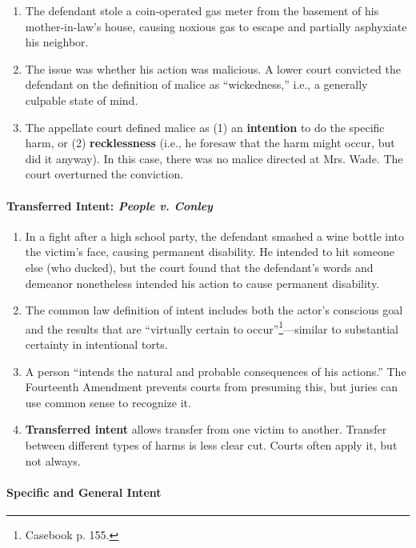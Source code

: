 \begin{enumerate}
    \item The defendant stole a coin-operated gas meter from the basement of 
    his mother-in-law's house, causing noxious gas to escape and partially 
    asphyxiate his neighbor.
    \item The issue was whether his action was malicious. A lower court 
    convicted the defendant on the definition of malice as ``wickedness,'' 
    i.e., a generally culpable state of mind.
    \item The appellate court defined malice as (1) an \textbf{intention} to 
    do the specific harm, or (2) \textbf{recklessness} (i.e., he foresaw that 
    the harm might occur, but did it anyway). In this case, there was no 
    malice directed at Mrs. Wade. The court overturned the conviction.
\end{enumerate}

\paragraph{Transferred Intent: \emph{People v. Conley}}

\begin{enumerate}
    \item In a fight after a high school party, the defendant smashed a wine 
    bottle into the victim's face, causing permanent disability. He intended 
    to hit someone else (who ducked), but the court found that the defendant's 
    words and demeanor nonetheless intended his action to cause permanent 
    disability.
    \item The common law definition of intent includes both the actor's 
    conscious goal and the results that are ``virtually certain to 
    occur''\footnote{Casebook p. 155.}---similar to substantial certainty in 
    intentional torts.
    \item A person ``intends the natural and probable consequences of his 
    actions.'' The Fourteenth Amendment prevents courts from presuming this, 
    but juries can use common sense to recognize it.
    \item \textbf{Transferred intent}  allows transfer from one victim to 
    another. Transfer between different types of harms is less clear cut.  
    Courts often apply it, but not always.
\end{enumerate}

\paragraph{Specific and General Intent}

